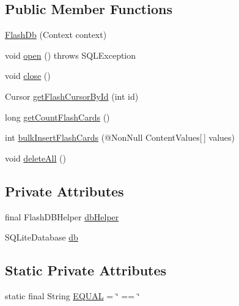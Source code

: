 \subsection*{Public Member Functions}
\begin{DoxyCompactItemize}
\item 
\hyperlink{classorg_1_1buildmlearn_1_1toolkit_1_1flashcardtemplate_1_1data_1_1FlashDb_afffe0fcac0d599c59ec35be8a72317a2}{Flash\+Db} (Context context)
\item 
void \hyperlink{classorg_1_1buildmlearn_1_1toolkit_1_1flashcardtemplate_1_1data_1_1FlashDb_a1271cf64726d1a9dccf240f2beba050b}{open} ()  throws S\+Q\+L\+Exception 
\item 
void \hyperlink{classorg_1_1buildmlearn_1_1toolkit_1_1flashcardtemplate_1_1data_1_1FlashDb_a10aaab2578442f796220f44c062a7aff}{close} ()
\item 
Cursor \hyperlink{classorg_1_1buildmlearn_1_1toolkit_1_1flashcardtemplate_1_1data_1_1FlashDb_a23ae15e75e1123399a2cb81cff0ea3a4}{get\+Flash\+Cursor\+By\+Id} (int id)
\item 
long \hyperlink{classorg_1_1buildmlearn_1_1toolkit_1_1flashcardtemplate_1_1data_1_1FlashDb_ace196947a528bf881e43fb13f40cfb17}{get\+Count\+Flash\+Cards} ()
\item 
int \hyperlink{classorg_1_1buildmlearn_1_1toolkit_1_1flashcardtemplate_1_1data_1_1FlashDb_a1073f0ae2bb2b323f7fa36e488ed086c}{bulk\+Insert\+Flash\+Cards} (@Non\+Null Content\+Values\mbox{[}$\,$\mbox{]} values)
\item 
void \hyperlink{classorg_1_1buildmlearn_1_1toolkit_1_1flashcardtemplate_1_1data_1_1FlashDb_aa120043c20a325c1db177960a0a4ab13}{delete\+All} ()
\end{DoxyCompactItemize}
\subsection*{Private Attributes}
\begin{DoxyCompactItemize}
\item 
final Flash\+D\+B\+Helper \hyperlink{classorg_1_1buildmlearn_1_1toolkit_1_1flashcardtemplate_1_1data_1_1FlashDb_ae21d788ab58332f36740310ea2275fd5}{db\+Helper}
\item 
S\+Q\+Lite\+Database \hyperlink{classorg_1_1buildmlearn_1_1toolkit_1_1flashcardtemplate_1_1data_1_1FlashDb_ada89a6b25f8c22594bf09f8e7b4ae0e4}{db}
\end{DoxyCompactItemize}
\subsection*{Static Private Attributes}
\begin{DoxyCompactItemize}
\item 
static final String \hyperlink{classorg_1_1buildmlearn_1_1toolkit_1_1flashcardtemplate_1_1data_1_1FlashDb_a25c392106b62a25f8dc98c8059891411}{E\+Q\+U\+AL} = \char`\"{} == \char`\"{}
\end{DoxyCompactItemize}


